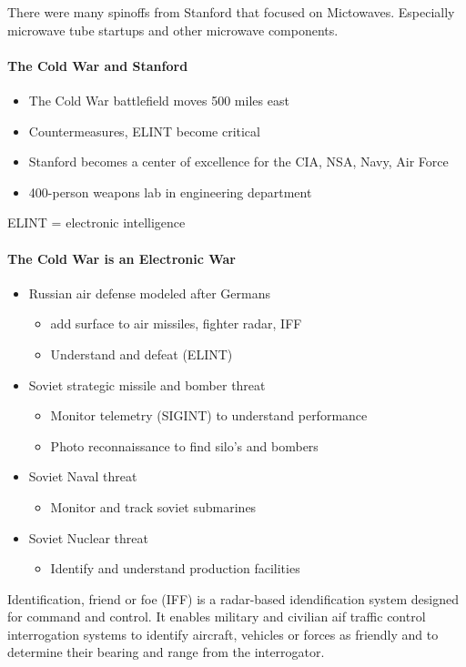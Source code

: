 There were many spinoffs from Stanford that focused on Mictowaves.
Especially microwave tube startups and other microwave components.

\paragraph{The Cold War and Stanford}

\begin{itemize}
    \item The Cold War battlefield moves 500 miles east
    \item Countermeasures, ELINT become critical
    \item Stanford becomes a center of excellence for the CIA, NSA, Navy, Air
        Force
    \item 400-person weapons lab in engineering department
\end{itemize}
ELINT = electronic intelligence

\paragraph{The Cold War is an Electronic War}

\begin{itemize}
    \item Russian air defense modeled after Germans
        \begin{itemize}
            \item add surface to air missiles, fighter radar, IFF
            \item Understand and defeat (ELINT)
        \end{itemize}
    \item Soviet strategic missile and bomber threat
        \begin{itemize}
            \item Monitor telemetry (SIGINT) to understand performance
            \item Photo reconnaissance to find silo's and bombers
        \end{itemize}
    \item Soviet Naval threat
        \begin{itemize}
            \item Monitor and track soviet submarines
        \end{itemize}
    \item Soviet Nuclear threat
        \begin{itemize}
            \item Identify and understand production facilities
        \end{itemize}
\end{itemize}
Identification, friend or foe (IFF) is a radar-based idendification system
designed for command and control. It enables military and civilian aif traffic
control interrogation systems to identify aircraft, vehicles or forces as
friendly and to determine their bearing and range from the interrogator.

